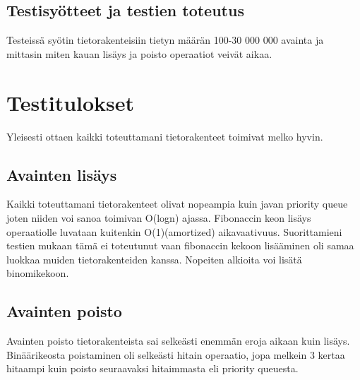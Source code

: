 \documentclass[11pt,a4paper]{article}
\begin{document}
\subsection{Testisyötteet ja testien toteutus}
Testeissä syötin tietorakenteisiin tietyn määrän 100-30 000 000 avainta ja mittasin miten kauan lisäys ja poisto operaatiot veivät aikaa.
\section{Testitulokset}
Yleisesti ottaen kaikki toteuttamani tietorakenteet toimivat melko hyvin. 
\subsection{Avainten lisäys}
Kaikki toteuttamani tietorakenteet olivat nopeampia kuin javan priority queue joten niiden voi sanoa toimivan O(logn) ajassa. Fibonaccin keon lisäys operaatiolle luvataan kuitenkin O(1)(amortized) aikavaativuus. Suorittamieni testien mukaan tämä ei toteutunut vaan fibonaccin kekoon lisääminen oli samaa luokkaa muiden tietorakenteiden kanssa. Nopeiten alkioita voi lisätä binomikekoon.
\subsection{Avainten poisto}
Avainten poisto tietorakenteista sai selkeästi enemmän eroja aikaan kuin lisäys. Binäärikeosta poistaminen oli selkeästi hitain operaatio, jopa melkein 3 kertaa hitaampi kuin poisto seuraavaksi hitaimmasta eli priority queuesta.
\end{document}
